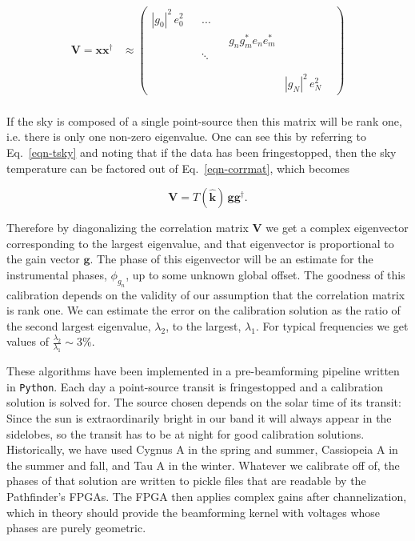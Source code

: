 \begin{align}
\label{eqn-corrmat}
\mathbf{V} = \mathbf{x} \mathbf{x}^\dagger &\approx \begin{pmatrix}
|g_0|^2\, e_0^2 &  & ... & & & \\ 
 &  &  & &  g_n g_m^* e_n e_m^*& \\ 
 &  &  \ddots & & & \\ 
 &  &  &  & & \\
&&&&&&\\
 &  &   &  & &  |g_N|^2 \, e_N^2
\end{pmatrix}
\end{align}
\\

If the sky is composed of a single point-source
then this matrix will be rank one, i.e. there is only one 
non-zero eigenvalue. One can see this by referring to Eq.~\ref{eqn-tsky} 
and noting that if the data has been fringestopped, then the 
sky temperature can be factored out of
Eq.~\ref{eqn-corrmat}, which becomes

\begin{equation}
\mathbf{V} = T(\mathbf{\hat{k}}) \, \mathbf{g} \mathbf{g}^\dagger.
\end{equation}

\noindent Therefore by diagonalizing the correlation matrix $\mathbf{V}$ 
we get a complex eigenvector corresponding to the largest 
eigenvalue, and that eigenvector is proportional to the gain vector $\mathbf{g}$. 
The phase of this eigenvector will be an estimate for the instrumental 
phases, $\phi_{g_n}$, up to some unknown global offset. The goodness 
of this calibration depends on the validity of our assumption 
that the correlation matrix is rank one. We can estimate the 
error on the calibration solution as the ratio of the second largest 
eigenvalue, $\lambda_2$, to the largest, $\lambda_1$. For typical 
frequencies we get values of $\frac{\lambda_2}{\lambda_1}\sim3\%$.

These algorithms have been implemented in a pre-beamforming 
pipeline written in {\tt Python}. Each day a point-source transit 
is fringestopped and a calibration solution is solved for. 
The source chosen depends on the solar time of its transit: Since the
sun is extraordinarily bright in our band it will always appear in the sidelobes,
so the transit has to be 
at night for good calibration solutions. Historically, 
we have used Cygnus A in the spring and summer, Cassiopeia A 
in the summer and fall, and Tau A in the winter. 
Whatever we calibrate off of, the phases of that solution are 
written to pickle files that are readable by the Pathfinder's FPGAs.
The FPGA then applies complex gains after channelization, which 
in theory should provide the beamforming kernel with voltages 
whose phases are purely geometric. 

